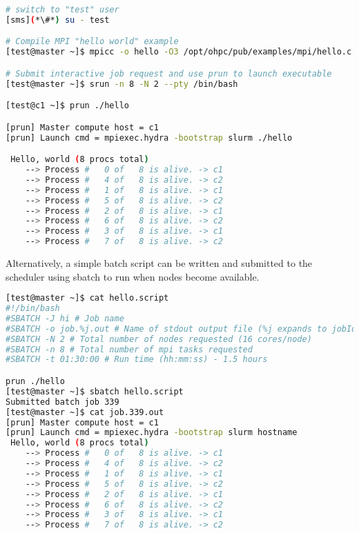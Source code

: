 \begin{lstlisting}[language=bash,keywords={}]
# switch to "test" user
[sms](*\#*) su - test

# Compile MPI "hello world" example
[test@master ~]$ mpicc -o hello -O3 /opt/ohpc/pub/examples/mpi/hello.c

# Submit interactive job request and use prun to launch executable
[test@master ~]$ srun -n 8 -N 2 --pty /bin/bash

[test@c1 ~]$ prun ./hello

[prun] Master compute host = c1
[prun] Launch cmd = mpiexec.hydra -bootstrap slurm ./hello

 Hello, world (8 procs total)
    --> Process #   0 of   8 is alive. -> c1
    --> Process #   4 of   8 is alive. -> c2
    --> Process #   1 of   8 is alive. -> c1
    --> Process #   5 of   8 is alive. -> c2
    --> Process #   2 of   8 is alive. -> c1
    --> Process #   6 of   8 is alive. -> c2
    --> Process #   3 of   8 is alive. -> c1
    --> Process #   7 of   8 is alive. -> c2
\end{lstlisting}

Alternatively, a simple batch script can be written and submitted to the
scheduler using sbatch to run when nodes become available. 

\begin{lstlisting}[language=bash,keywords={}]
[test@master ~]$ cat hello.script
#!/bin/bash
#SBATCH -J hi # Job name
#SBATCH -o job.%j.out # Name of stdout output file (%j expands to jobId)
#SBATCH -N 2 # Total number of nodes requested (16 cores/node)
#SBATCH -n 8 # Total number of mpi tasks requested
#SBATCH -t 01:30:00 # Run time (hh:mm:ss) - 1.5 hours

prun ./hello
[test@master ~]$ sbatch hello.script
Submitted batch job 339
[test@master ~]$ cat job.339.out
[prun] Master compute host = c1
[prun] Launch cmd = mpiexec.hydra -bootstrap slurm hostname
 Hello, world (8 procs total)
    --> Process #   0 of   8 is alive. -> c1
    --> Process #   4 of   8 is alive. -> c2
    --> Process #   1 of   8 is alive. -> c1
    --> Process #   5 of   8 is alive. -> c2
    --> Process #   2 of   8 is alive. -> c1
    --> Process #   6 of   8 is alive. -> c2
    --> Process #   3 of   8 is alive. -> c1
    --> Process #   7 of   8 is alive. -> c2
\end{lstlisting}

